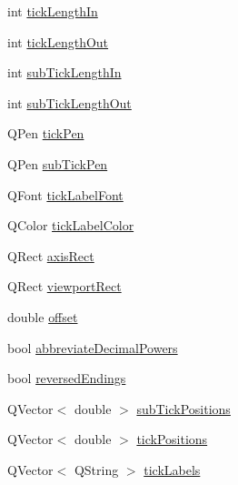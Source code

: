 \begin{DoxyCompactItemize}
int \mbox{\hyperlink{class_q_c_p_axis_painter_private_ae7360ff805fc6097019de8b35ffbd7e7}{tick\+Length\+In}}
\item 
int \mbox{\hyperlink{class_q_c_p_axis_painter_private_acbebb1f868906200f968627bc907b77d}{tick\+Length\+Out}}
\item 
int \mbox{\hyperlink{class_q_c_p_axis_painter_private_af11f7d83021c9cb3b0e76fe7814c6110}{sub\+Tick\+Length\+In}}
\item 
int \mbox{\hyperlink{class_q_c_p_axis_painter_private_a5f1afddc3dc7ccc4d5adcbcd8f0c2218}{sub\+Tick\+Length\+Out}}
\item 
Q\+Pen \mbox{\hyperlink{class_q_c_p_axis_painter_private_a389dde97f02fdee23965e4736e7d8c62}{tick\+Pen}}
\item 
Q\+Pen \mbox{\hyperlink{class_q_c_p_axis_painter_private_a9b9cf594cd16575f52ecda9abef4e412}{sub\+Tick\+Pen}}
\item 
Q\+Font \mbox{\hyperlink{class_q_c_p_axis_painter_private_a06cb4b185feb1e560e01d65887e4d80d}{tick\+Label\+Font}}
\item 
Q\+Color \mbox{\hyperlink{class_q_c_p_axis_painter_private_a88032cf15c997e3956b79617b859e8ad}{tick\+Label\+Color}}
\item 
Q\+Rect \mbox{\hyperlink{class_q_c_p_axis_painter_private_afcd55b0e1ecd689fffd2b1fc75dc7732}{axis\+Rect}}
\item 
Q\+Rect \mbox{\hyperlink{class_q_c_p_axis_painter_private_a8627dc6b40781e3291bb508e4ac574d6}{viewport\+Rect}}
\item 
double \mbox{\hyperlink{class_q_c_p_axis_painter_private_aea226a1e39357d71f66d85093e30a830}{offset}}
\item 
bool \mbox{\hyperlink{class_q_c_p_axis_painter_private_a68353c2eeabd00d96a2e36a0b3809cb2}{abbreviate\+Decimal\+Powers}}
\item 
bool \mbox{\hyperlink{class_q_c_p_axis_painter_private_a06d0ef3f4f1b567feb84196fc3b140da}{reversed\+Endings}}
\item 
Q\+Vector$<$ double $>$ \mbox{\hyperlink{class_q_c_p_axis_painter_private_afcde7484bbcc1004b8f59ab984ada6f9}{sub\+Tick\+Positions}}
\item 
Q\+Vector$<$ double $>$ \mbox{\hyperlink{class_q_c_p_axis_painter_private_ae55e3dc2cf2af8d8a6e7235ccab54786}{tick\+Positions}}
\item 
Q\+Vector$<$ Q\+String $>$ \mbox{\hyperlink{class_q_c_p_axis_painter_private_ad0a4998ca358ba751e84fca45a025abd}{tick\+Labels}}
\end{DoxyCompactItemize}
